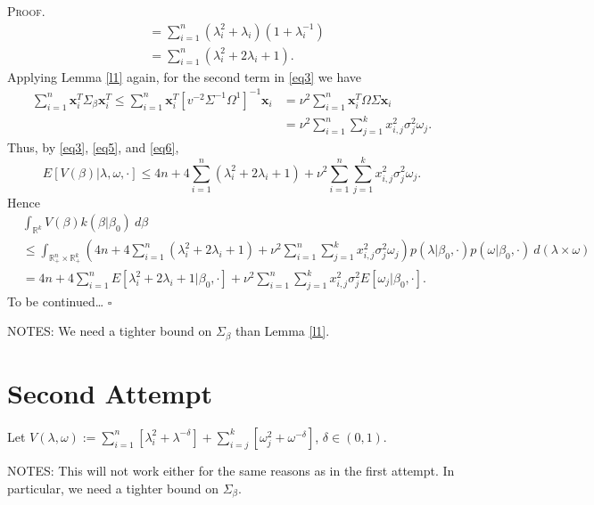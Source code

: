 \documentclass[12pt]{article}
\newcounter{ProofCounter}
\newenvironment{Proof}{\stepcounter{ProofCounter}\textsc{Proof.}}{\hfill$\square$}
\begin{document}
\begin{Proof}
\begin{align}
    & = \sum_{i=1}^{n}(\lambda_i^2 + \lambda_i)(1 + \lambda_i^{-1}) \nonumber \\
    & = \sum_{i=1}^{n}(\lambda_i^2 + 2\lambda_i + 1).
    \label{eq5}
  \end{align}
  Applying Lemma \ref{l1} again, for the second term in \eqref{eq3} we have 
  \begin{align}
    \sum_{i=1}^{n} \bm{x}_i^T\Sigma_{\beta} \bm{x}_i^T \leq \sum_{i=1}^{n} \bm{x}_i^T[v^{-2}\Sigma^{-1}\Omega^{1}]^{-1}\bm{x}_i & = \nu^2\sum_{i=1}^{n} 
    \bm{x}_i^T \Omega \Sigma \bm{x}_i \nonumber \\
    & = \nu^2 \sum_{i=1}^{n} \sum_{j=1}^{k}x_{i,j}^2 \sigma_{j}^2 \omega_j.
    \label{eq6}
  \end{align}
  Thus, by \eqref{eq3}, \eqref{eq5}, and \eqref{eq6}, 
  \[
    E[V(\beta)|\lambda, \omega, \cdot] \leq 4n + 4\sum_{i=1}^{n}(\lambda_i^2 + 2\lambda_i + 1) + \nu^2 \sum_{i=1}^{n} \sum_{j=1}^{k}x_{i,j}^2
    \sigma_j^2 \omega_j.
  \]
  Hence 
  \begin{align}
    & \int_{\mathbb{R}^{k}} V(\beta) k(\beta|\beta_0)\ d\beta \nonumber \\
    & \leq \int_{\mathbb{R}^{n}_+ \times \mathbb{R}^{k}_+}
    \left(4n + 4\sum_{i=1}^{n}(\lambda_i^2 + 2\lambda_i + 1) + \nu^2 \sum_{i=1}^{n}\sum_{j=1}^{k}x_{i,j}^2 \sigma_j^2 \omega_j \right)
    p(\lambda|\beta_0, \cdot) p(\omega|\beta_0,\cdot)\ d(\lambda \times \omega) \nonumber \\
    & = 4n + 4\sum_{i=1}^{n}E[\lambda_i^2 + 2\lambda_i + 1|\beta_0, \cdot] + \nu^2\sum_{i=1}^{n}\sum_{j=1}^{k}x_{i,j}^2\sigma_j^2
    E[\omega_j|\beta_0,\cdot].
    \label{eq7}
  \end{align}
  {\Large To be continued\dots}
\end{Proof}

NOTES: We need a tighter bound on $\Sigma_{\beta}$ than Lemma \ref{l1}.

\newpage

\section{Second Attempt}

Let $V(\lambda, \omega) := \sum_{i=1}^{n}[\lambda_i^2 + \lambda^{-\delta}] + \sum_{i=j}^{k}[\omega_j^2 + \omega^{-\delta}]$, $\delta \in (0,1)$.

NOTES: This will not work either for the same reasons as in the first attempt. In particular, we need a tighter bound on $\Sigma_{\beta}$.
\end{document}
